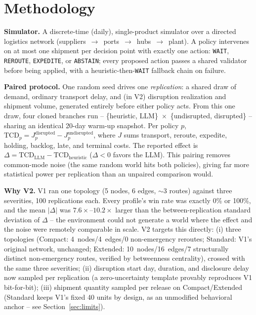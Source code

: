 \documentclass[10pt,twocolumn]{article}
\newcommand{\tcd}{\ensuremath{\mathrm{TCD}}}
\begin{document}
\section{Methodology}
\label{sec:method}
\textbf{Simulator.} A discrete-time (daily), single-product simulator over a directed logistics network (suppliers~$\to$~ports~$\to$~hubs~$\to$~plant). A policy intervenes on at most one shipment per decision point with exactly one action: \texttt{WAIT}, \texttt{REROUTE}, \texttt{EXPEDITE}, or \texttt{ABSTAIN}; every proposed action passes a shared validator before being applied, with a heuristic-then-\texttt{WAIT} fallback chain on failure.

\textbf{Paired protocol.} One random seed drives one \emph{replication}: a shared draw of demand, ordinary transport delay, and (in V2) disruption realization and shipment volume, generated entirely before either policy acts. From this one draw, four cloned branches run -- \{heuristic, LLM\}~$\times$~\{undisrupted, disrupted\} -- sharing an identical 20-day warm-up snapshot. Per policy $p$, $\tcd_p = J^{\text{disrupted}}_p - J^{\text{undisrupted}}_p$, where $J$ sums transport, reroute, expedite, holding, backlog, late, and terminal costs. The reported effect is $\Delta = \tcd_{\text{LLM}} - \tcd_{\text{heuristic}}$ ($\Delta<0$ favors the LLM). This pairing removes common-mode noise (the same random world hits both policies), giving far more statistical power per replication than an unpaired comparison would.

\textbf{Why V2.} V1 ran one topology (5 nodes, 6 edges, $\sim$3 routes) against three severities, 100 replications each. Every profile's win rate was exactly 0\% or 100\%, and the mean $|\Delta|$ was $7.6\times$--$10.2\times$ larger than the between-replication standard deviation of $\Delta$ -- the environment could not generate a world where the effect and the noise were remotely comparable in scale. V2 targets this directly: (i) three topologies (Compact: 4~nodes/4~edges/0 non-emergency reroutes; Standard: V1's original network, unchanged; Extended: 10~nodes/16~edges/7 structurally distinct non-emergency routes, verified by betweenness centrality), crossed with the same three severities; (ii) disruption start day, duration, and disclosure delay now sampled per replication (a zero-uncertainty template provably reproduces V1 bit-for-bit); (iii) shipment quantity sampled per release on Compact/Extended (Standard keeps V1's fixed 40 units by design, as an unmodified behavioral anchor -- see Section~\ref{sec:limits}).
\end{document}
